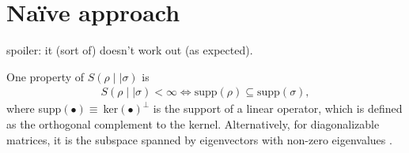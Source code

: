 %
%
%
%
%
%
\section{Na\"ive approach}
spoiler: it (sort of) doesn't work out (as expected).

One property of $S(\rho\mid\mid\sigma)$ is
\cite{leditzkyRelativeEntropiesTheir2016}
\begin{align}\label{eq:inf-cond}
  S(\rho\mid\mid\sigma) < \infty \Longleftrightarrow \mathrm{supp}(\rho) \subseteq
  \mathrm{supp}(\sigma)
,\end{align}
where supp$(\bullet)\equiv\ $ker$(\bullet)^\perp$ is the support of a linear
operator, which is defined as the orthogonal complement to the kernel.
Alternatively, for diagonalizable matrices, it is the subspace spanned by
eigenvectors with non-zero eigenvalues
\cite{schumacherRelativeEntropyQuantum2000}.


